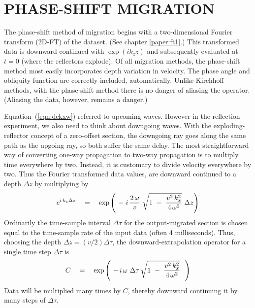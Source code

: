 
\section{PHASE-SHIFT MIGRATION}
The phase-shift method of migration
begins with a two-dimensional Fourier transform (2D-FT) of the dataset.
(See chapter \ref{paper:ft1}.)
This transformed data is downward continued
with  $\exp(ik_z z)$  and subsequently evaluated
at $t=0$ (where the reflectors explode).
Of all migration methods,
the phase-shift method
most easily incorporates depth variation in velocity.
The phase angle and obliquity function are correctly included,
automatically.
Unlike Kirchhoff methods,
with the phase-shift method there is no danger of aliasing the operator.
(Aliasing the data, however, remains a danger.)

\par
Equation~(\ref{eqn:dckxw}) referred to upcoming waves.
However in the reflection experiment,
we also need to think about downgoing waves.
With the exploding-reflector concept of a zero-offset section,
the downgoing ray goes along the same path as the upgoing ray,
so both suffer the same delay.
The most straightforward way of converting one-way propagation
to two-way propagation is to multiply time everywhere by two.
Instead, it is customary to divide velocity everywhere by two.
Thus the Fourier transformed data values,
are downward continued to a depth $\Delta z$ by multiplying by
\begin{equation}
e^{ i\,k_z \Delta z }
\quad =\quad
\exp \left(  \  - \ i \, {2\,\omega \over v }\ \sqrt{
1 \ -\  { v^2\,k_x^2   \over 4\,\omega^2 } }
\  \Delta z \right)
\label{eqn:3.4}
\end{equation}
Ordinarily the time-sample interval $\Delta \tau$  for the output-migrated
section is chosen equal to the time-sample rate
of the input data (often 4 milliseconds).
Thus, choosing the depth  $ \Delta z = (v/2) \Delta \tau $,
the downward-extrapolation operator for a single time step $\Delta \tau$ is
\begin{equation}
C\quad =\quad
\exp  \left( \  - \,i \, \omega \  \Delta \tau\,\sqrt{
1 \ -\  { v^2\,k_x^2   \over 4\,\omega^2 } }
\ \ \right)
\label{eqn:3.5}
\end{equation}
Data will be multiplied many times by  $C$,  thereby downward
continuing it by many steps of  $\Delta \tau$.

